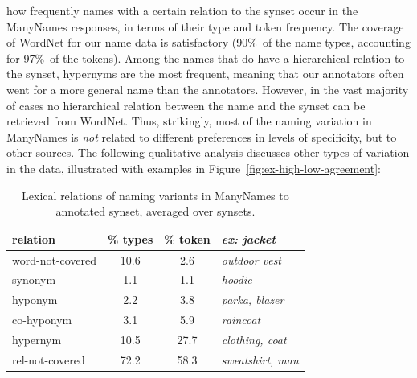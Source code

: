 how frequently names with a certain relation to the synset occur in the ManyNames responses, in terms of their  type and token frequency. 
The coverage of WordNet for our name data is satisfactory (90\%\ of the name types, accounting for 97\%\ of the tokens).
Among the names that do have a hierarchical relation to the synset, hypernyms are the most frequent, meaning that our annotators often went for a more general name than the \vg annotators.
However, in the vast majority of cases no hierarchical relation between the name and the synset can be retrieved from WordNet.
Thus, strikingly, most of the naming variation in ManyNames is \textit{not} related to different preferences in levels of specificity, %
 but to other sources. The following qualitative analysis discusses other types of variation in the data, illustrated with examples in Figure\ \ref{fig:ex-high-low-agreement}:
%
\begin{table}[t]
\small
\centering
\setlength{\tabcolsep}{2pt}
\begin{tabular}{lcc|p{2.5cm}}
\toprule
         relation & \% types & \% token & \it ex: jacket \\
\midrule
 word-not-covered &  10.6 &  2.6 & \it outdoor vest\\
\midrule
 synonym &  1.1 &  1.1 & \it hoodie  \\
 hyponym &  2.2 &  3.8 & \it parka, blazer \\
 co-hyponym &  3.1 &  5.9 & \it raincoat\\
 hypernym &  10.5 &  27.7 & \it clothing, coat\\
 rel-not-covered &  72.2 &  58.3 & \it sweatshirt, man\\
\bottomrule
\end{tabular}
\caption{Lexical relations of naming variants in ManyNames to annotated \vg synset, averaged over synsets.}
\label{tab:rel}
\vspace{-0.5cm}
\end{table}

